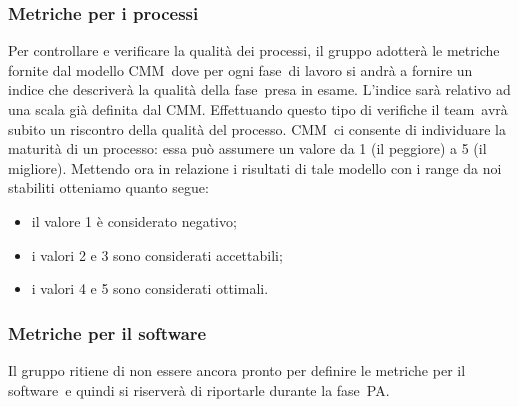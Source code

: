 \documentclass[../PianoDiQualifica.tex]{subfiles}
\begin{document}
			\subsubsection{Metriche per i processi}
			Per controllare e verificare la qualità dei processi, il gruppo adotterà le metriche fornite dal
			modello CMM\g\ dove per ogni fase\g\ di lavoro si andrà a fornire un indice che descriverà la
			qualità della fase\g\ presa in esame. L'indice sarà relativo ad una scala già definita dal CMM\g.
			Effettuando questo tipo di verifiche il team\g\ avrà subito un riscontro della qualità del processo\g. CMM\g\ ci consente di individuare la maturità di un processo\g: essa può assumere un valore da 1 (il
			peggiore) a 5 (il migliore). Mettendo ora in relazione i risultati di tale modello con i range da noi
			stabiliti otteniamo quanto segue:
			\begin{itemize}
			\item il valore 1 è considerato negativo;
			\item i valori 2 e 3 sono considerati accettabili;
			\item i valori 4 e 5 sono considerati ottimali.
			\end{itemize}
			\subsubsection{Metriche per il software}
			Il gruppo ritiene di non essere ancora pronto per definire le metriche per il software\g\ e quindi si riserverà di riportarle durante la fase\g\ PA.
\end{document}
